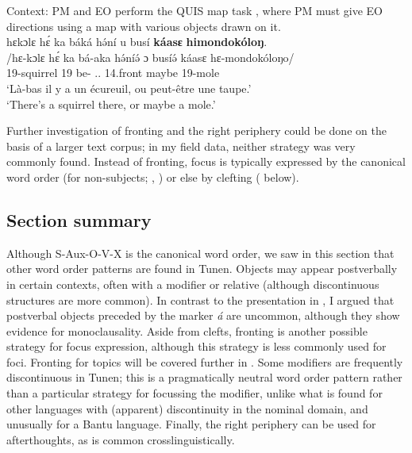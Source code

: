 \documentclass[output=paper,colorlinks,citecolor=brown
]{langscibook}
\begin{document}
\ea
\label{squirrelmaybemole}
Context: PM and EO perform the QUIS map task \citep[155--157]{SkopeteasEtAl2006}, where PM must give EO directions using a map with various objects drawn on it. \\
\glll
{\db}hɛkɔlɛ hɛ́ ka báká hə́ní u busí \textbf{káasɛ} \textbf{himondokóloŋ}. \\
/hɛ-kɔlɛ hɛ́ ka bá-aka hə́níə́ ɔ busíə́ káasɛ hɛ-mondokóloŋo/  \\
{\db}19-squirrel 19\SM{} \AND{} be-\DUR{} \DEM{}.\DIST{}.\LOC{} \PREP{} 14.front maybe 19-mole \\
\glt
`Là-bas il y a un écureuil, ou peut-être une taupe.' \\ `There's a squirrel there, or maybe a mole.' \jambox*{[PM 707] }

\z

Further investigation of fronting and the right periphery could be done on the basis of a larger text corpus; in my field data, neither strategy was very commonly found. Instead of fronting, focus is typically expressed by the canonical word order (for non-subjects; , ) or else by clefting ( below).

\subsection{Section summary}
Although S-Aux-O-V-X is the canonical word order, we saw in this section that other word order patterns are found in Tunen.  Objects may appear postverbally in certain contexts, often with a modifier or relative (although discontinuous structures are more common). In contrast to the presentation in \citet{Mous1997, Mous2003}, I argued that postverbal objects preceded by the marker \textit{á} are uncommon, although they show evidence for monoclausality. Aside from clefts, fronting is another possible strategy for focus expression, although this strategy is less commonly used for foci. Fronting for topics will be covered further in . Some modifiers are frequently discontinuous in Tunen; this is a pragmatically neutral word order pattern rather than a particular strategy for focussing the modifier, unlike what is found for other languages with (apparent) discontinuity in the nominal domain, and unusually for a Bantu language. Finally, the right periphery can be used for afterthoughts, as is common crosslinguistically.
\end{document}
